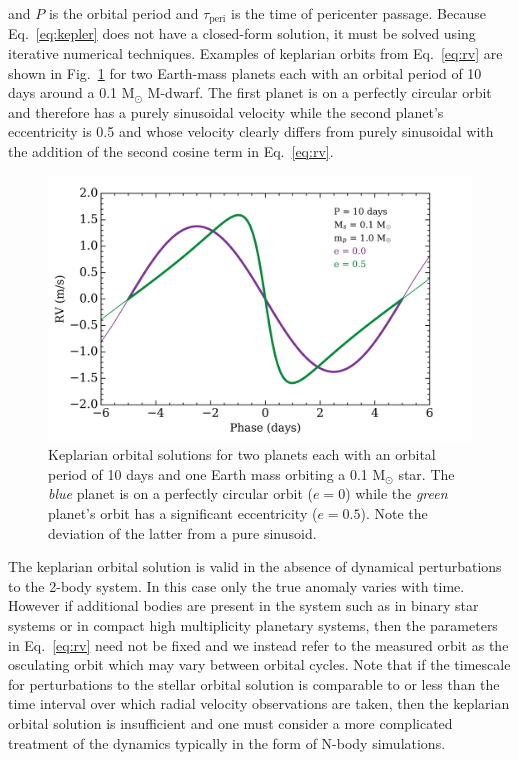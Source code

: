 \noindent and $P$ is the orbital period and $\tau_{\mathrm{peri}}$ is the time of 
pericenter passage. Because Eq.~\ref{eq:kepler} does not have a closed-form 
solution, it must be solved using iterative numerical techniques. 
Examples of keplarian orbits from Eq.~\ref{eq:rv} are shown in Fig.~\ref{fig:rv} 
for two 
Earth-mass planets each with an orbital period of 10 days around a 0.1 M$_{\odot}$ 
M-dwarf. The first planet is on a perfectly circular orbit and therefore 
has a purely sinusoidal 
velocity while the second planet's eccentricity is 0.5 and whose velocity 
clearly differs from purely sinusoidal with the addition of the second 
cosine term in Eq.~\ref{eq:rv}. \\

\begin{figure}
\centering
\includegraphics[scale=0.6]{figures/rvcurve_example.png}
\caption{Keplarian orbital solutions for two planets each with an orbital period of 10 days 
and one Earth mass orbiting a 0.1 M$_{\odot}$ star. The \emph{blue} planet is on a 
perfectly circular orbit ($e=0$) while the \emph{green} planet's orbit has a significant 
eccentricity ($e=0.5$). Note the deviation of the latter from a pure sinusoid. \label{fig:rv}}
\end{figure}

The keplarian orbital solution is valid in the absence of dynamical 
perturbations to the 2-body system. In this case only the true anomaly varies with 
time. However if additional bodies are present in the system such as in binary star 
systems or in compact high multiplicity planetary systems, then the parameters in 
Eq.~\ref{eq:rv} need not be fixed and we instead refer to the measured orbit as the 
osculating orbit which may vary between orbital cycles. Note that if the timescale 
for perturbations to the stellar orbital solution is comparable to or less than the 
time interval over which radial velocity observations are taken, then the keplarian 
orbital solution is insufficient and one must consider a more complicated treatment 
of the dynamics typically in the form of N-body simulations.

